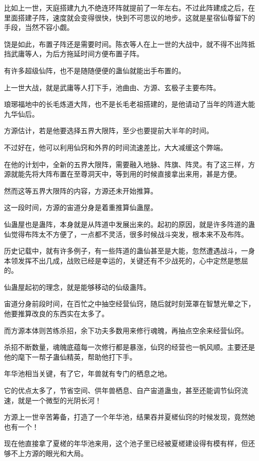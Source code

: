 \begin{this_body}
比如上一世，天庭搭建九九不绝连环阵就提前了一年左右。不过此阵建成之后，在里面搭建子阵，速度就会变得很快，快到不可思议的地步。这就是星宿仙尊留下的手段，当然不容小觑。

饶是如此，布置子阵还是需要时间。陈衣等人在上一世的大战中，就不得不出阵抵挡武庸等人，为后方拖延时间方便布置子阵。

有许多超级仙阵，也不是随随便便的蛊仙就能出手布置的。

上一世大战，就是武庸等人打下手，池曲由、方源、玄极子主要布阵。

琅琊福地中的长毛炼道大阵，也不是长毛老祖搭建的，是他请动了当年的阵道大能九华仙后。

方源估计，若是他要选择五界大限阵，至少也要提前大半年的时间。

不过好在，他可以利用仙窍和外界的时间流速差比，大大减缓这个弊端。

在他的计划中，全新的五界大限阵，需要融入地脉、阵旗、阵灵。有了这三样，方源就能先将大阵布置在至尊洞天中，等到用的时候直接拿出来用，甚是方便。

然而这等五界大限阵的内容，方源还未开始推算。

这一段时间，方源的宙道分身是着重推算仙蛊屋。

仙蛊屋也是蛊阵，本身就是从阵道中发展出来的。起初的原因，就是许多阵道的蛊仙觉得布阵太不方便了，一点都不灵活，很多时候战斗突发，根本来不及布阵。

历史记载中，就有许多例子，有一些阵道的蛊仙甚至是大能，忽然遭遇战斗，一身本领发挥不出几成，战败已经是幸运的，关键还有不少战死的，心中定然是憋屈的。

仙蛊屋起初的理念，就是能够移动的仙级蛊阵。

宙道分身前段时间，在百忙之中抽空经营仙窍，随后就时刻笼罩在智慧光晕之下，他要推算改良的东西实在太多了。

而方源本体则苦练杀招，余下功夫多数用来修行魂魄，再抽点空余来经营仙窍。

杀招不断数量，魂魄底蕴每一次修行都是暴涨，仙窍的经营也一帆风顺。主要还是他的麾下一帮子蛊仙精英，帮助他打下手。

年华池相当关键，有了它，年兽就有专门的栖息之地。

它的优点太多了，节省空间、供年兽栖息、自产宙道蛊虫，甚至还能调节仙窍流速，就是一个微型的光阴长河！

方源上一世辛苦筹备，打造了一个年华池，结果吞并夏槎仙窍的时候发现，竟然她也有一个！

现在他直接拿了夏槎的年华池来用，这个池子里已经被夏槎建设得有模有样，但还够不上方源的眼光和大局。


\end{this_body}
